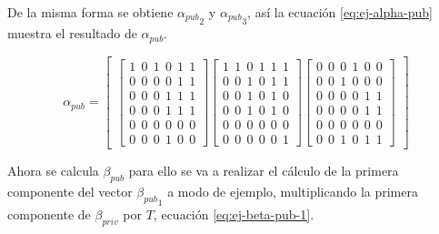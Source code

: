 De la misma forma se obtiene ${\alpha_{pub}}_2$ y ${\alpha_{pub}}_3$, así la ecuación \ref{eq:ej-alpha-pub} muestra el resultado de $\alpha_{pub}$.


\begin{equation}\label{eq:ej-alpha-pub}
{\alpha_{pub}} = \left[
	\begin{array}{c}
	\left[\begin{array}{c}
		1\ \ 0\ \ 1\ \ 0\ \ 1\ \ 1\\
		0\ \ 0\ \ 0\ \ 0\ \ 1\ \ 1\\
		0\ \ 0\ \ 0\ \ 1\ \ 1\ \ 1\\
		0\ \ 0\ \ 0\ \ 1\ \ 1\ \ 1\\
		0\ \ 0\ \ 0\ \ 0\ \ 0\ \ 0\\
		0\ \ 0\ \ 0\ \ 1\ \ 0\ \ 0
	\end{array}\right]
		
	\left[\begin{array}{c}
		1\ \ 1\ \ 0\ \ 1\ \ 1\ \ 1\\
		0\ \ 0\ \ 1\ \ 0\ \ 1\ \ 1\\
		0\ \ 0\ \ 1\ \ 0\ \ 1\ \ 0\\
		0\ \ 0\ \ 1\ \ 0\ \ 1\ \ 0\\
		0\ \ 0\ \ 0\ \ 0\ \ 0\ \ 0\\
		0\ \ 0\ \ 0\ \ 0\ \ 0\ \ 1
	\end{array}\right]
	
	\left[\begin{array}{c}
		0\ \ 0\ \ 0\ \ 1\ \ 0\ \ 0\\
		0\ \ 0\ \ 1\ \ 0\ \ 0\ \ 0\\
		0\ \ 0\ \ 0\ \ 0\ \ 1\ \ 1\\
		0\ \ 0\ \ 0\ \ 0\ \ 1\ \ 1\\
		0\ \ 0\ \ 0\ \ 0\ \ 0\ \ 0\\
		0\ \ 0\ \ 1\ \ 0\ \ 1\ \ 1
	\end{array}\right]
	\end{array}
	\right]
\end{equation}

\newpage
Ahora se calcula $\beta_{pub}$ para ello se va a realizar el cálculo de la primera componente del vector ${\beta_{pub}}_1$ a modo de ejemplo, multiplicando la primera componente de $\beta_{priv}$ por $T$, ecuación \ref{eq:ej-beta-pub-1}.

